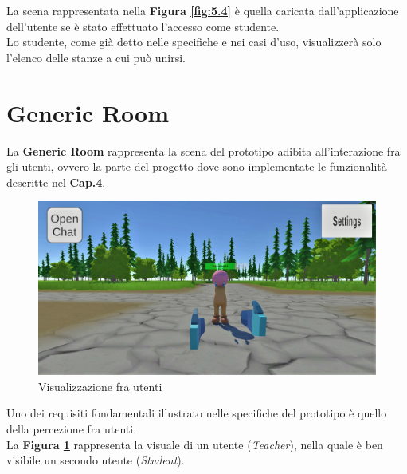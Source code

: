 \hspace{-0.6cm}La scena rappresentata nella \textbf{Figura \ref{fig:5.4}} è quella caricata dall'applicazione dell'utente se è stato effettuato l'accesso come studente.
\\Lo studente, come già detto nelle specifiche e nei casi d'uso, visualizzerà solo l'elenco delle stanze a cui può unirsi.
\section{Generic Room}
La \textbf{Generic Room} rappresenta la scena del prototipo adibita all'interazione fra gli utenti, ovvero la parte del progetto dove sono implementate le funzionalità descritte nel \textbf{Cap.4}.
\begin{figure}[H]
\centering
\includegraphics[scale = 0.25]{Immagini/Dimostrazioni d'uso/civediamo.jpg}
\caption{Visualizzazione fra utenti}
\label{fig:5.5}
\end{figure}
\hspace{-0.6cm}Uno dei requisiti fondamentali illustrato nelle specifiche del prototipo è quello della percezione fra utenti.
\\La \textbf{Figura \ref{fig:5.5}} rappresenta la visuale di un utente (\textit{Teacher}), nella quale è ben visibile un secondo utente (\textit{Student}).
